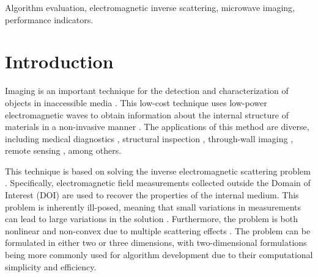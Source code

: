 \documentclass{IEEEtran}
\begin{document}
    \begin{IEEEkeywords}
        Algorithm evaluation, electromagnetic inverse scattering, microwave imaging, performance indicators.
    \end{IEEEkeywords}
    
    \section{Introduction}\label{sec:introduction}


         Imaging is an important technique for the detection and characterization of objects in inaccessible media \cite{pastorino2010microwave}. This low-cost technique uses low-power electromagnetic waves to obtain information about the internal structure of materials in a non-invasive manner \cite{godinho2025evaluation}. The applications of this method are diverse, including medical diagnostics \cite{mojabi2025microwave}, structural inspection \cite{fedeli2025mild}, through-wall imaging \cite{fedeli2020through}, remote sensing \cite{salucci2017multifrequency}, among others.


        This technique is based on solving the inverse electromagnetic scattering problem \cite{chen2018computational}. Specifically, electromagnetic field measurements collected outside the Domain of Interest (DOI) are used to recover the properties of the internal medium. This problem is inherently ill-posed, meaning that small variations in measurements can lead to large variations in the solution \cite{colton2019inverse}. Furthermore, the problem is both nonlinear and non-convex due to multiple scattering effects \cite{chen2018computational}. The problem can be formulated in either two or three dimensions, with two-dimensional formulations being more commonly used for algorithm development due to their computational simplicity and efficiency.
        
\end{document}
